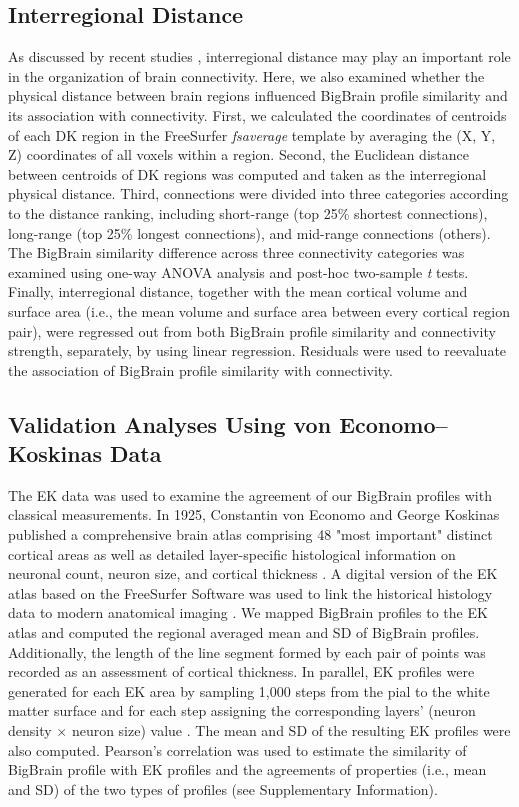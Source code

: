 \begin{refsection}
\subsection*{Interregional Distance}
As discussed by recent studies \citep{beul2017predictive,beul2015predictive}, interregional distance may play an important role in the organization of brain connectivity. Here, we also examined whether the physical distance between brain regions influenced BigBrain profile similarity and its association with connectivity. First, we calculated the coordinates of centroids of each DK region in the FreeSurfer \textit{fsaverage} template by averaging the (X, Y, Z) coordinates of all voxels within a region. Second, the Euclidean distance between centroids of DK regions was computed and taken as the interregional physical distance. Third, connections were divided into three categories according to the distance ranking, including short-range (top 25\% shortest connections), long-range (top 25\% longest connections), and mid-range connections (others). The BigBrain similarity difference across three connectivity categories was examined using one-way ANOVA analysis and post-hoc two-sample \textit{t} tests. Finally, interregional distance, together with the mean cortical volume and surface area (i.e., the mean volume and surface area between every cortical region pair), were regressed out from both BigBrain profile similarity and connectivity strength, separately, by using linear regression. Residuals were used to reevaluate the association of BigBrain profile similarity with connectivity.

\subsection*{Validation Analyses Using von Economo–Koskinas Data}
The EK data was used to examine the agreement of our BigBrain profiles with classical measurements. In 1925, Constantin von Economo and George Koskinas published a comprehensive brain atlas comprising 48 "most important" distinct cortical areas as well as detailed layer-specific histological information on neuronal count, neuron size, and cortical thickness \citep{von1925cytoarchitektonik}. A digital version of the EK atlas based on the FreeSurfer Software \citep{FISCHL2012Freesurfer} was used to link the historical histology data to modern anatomical imaging \citep{SCHOLTENS2018ECONOMO,Scholtens2015ECONOMO}. We mapped BigBrain profiles to the EK atlas and computed the regional averaged mean and SD of BigBrain profiles. Additionally, the length of the line segment formed by each pair of points was recorded as an assessment of cortical thickness. In parallel, EK profiles were generated for each EK area by sampling 1,000 steps from the pial to the white matter surface and for each step assigning the corresponding layers' (neuron density $\times$ neuron size) value \citep{von1925cytoarchitektonik}. The mean and SD of the resulting EK profiles were also computed. Pearson's correlation was used to estimate the similarity of BigBrain profile with EK profiles and the agreements of properties (i.e., mean and SD) of the two types of profiles (see Supplementary Information).


\end{refsection}

